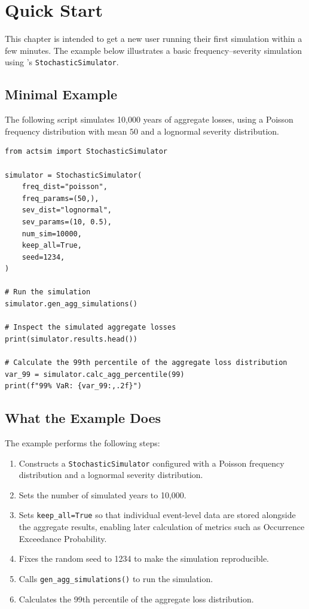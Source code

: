 \chapter{Quick Start}
\label{chap:quick_start}

This chapter is intended to get a new user running their first simulation
within a few minutes. The example below illustrates a basic
frequency--severity simulation using \actsim's \texttt{StochasticSimulator}.

\section{Minimal Example}

The following script simulates 10{,}000 years of aggregate losses, using a
Poisson frequency distribution with mean $50$ and a lognormal severity
distribution.

\begin{lstlisting}[style=pythonstyle]
from actsim import StochasticSimulator

simulator = StochasticSimulator(
    freq_dist="poisson",
    freq_params=(50,),
    sev_dist="lognormal",
    sev_params=(10, 0.5),
    num_sim=10000,
    keep_all=True,
    seed=1234,
)

# Run the simulation
simulator.gen_agg_simulations()

# Inspect the simulated aggregate losses
print(simulator.results.head())

# Calculate the 99th percentile of the aggregate loss distribution
var_99 = simulator.calc_agg_percentile(99)
print(f"99% VaR: {var_99:,.2f}")
\end{lstlisting}

\section{What the Example Does}

The example performs the following steps:

\begin{enumerate}[leftmargin=*]
    \item Constructs a \texttt{StochasticSimulator} configured with a
          Poisson frequency distribution and a lognormal severity
          distribution.
    \item Sets the number of simulated years to 10{,}000.
    \item Sets \texttt{keep\_all=True} so that individual event-level data
          are stored alongside the aggregate results, enabling later
          calculation of metrics such as Occurrence Exceedance Probability.
    \item Fixes the random seed to 1234 to make the simulation reproducible.
    \item Calls \texttt{gen\_agg\_simulations()} to run the simulation.
    \item Calculates the 99th percentile of the aggregate loss
          distribution.
\end{enumerate}


